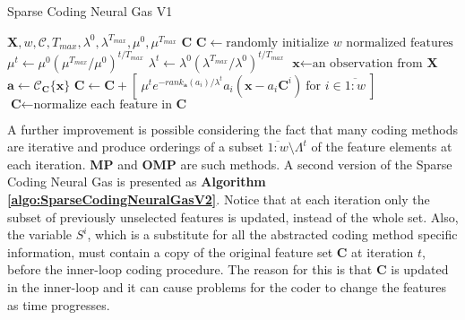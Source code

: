 \documentclass[12pt,a4paper,oneside,english]{UPBThesis}
\newcommand{\hcrange}[2]{\overline{{#1}\colon\!\!{#2}}}
\begin{document}
\begin{algorithm}
\caption{Sparse Coding Neural Gas V1}
\label{algo:SparseCodingNeuralGasV1}
\begin{algorithmic}
\Require $\textbf{X},w,\mathcal{C},T_{max},\lambda^0,\lambda^{T_{max}},\mu^0,\mu^{T_{max}}$
\Ensure $\textbf{C}$
\State $\textbf{C} \gets \mbox{randomly initialize $w$ normalized features}$
\For {$t = \hcrange{1}{T_{max}}$}
\State $\mu^t \gets \mu^0 (\mu^{T_{max}} / \mu^0)^{t / T_{max}}$  
\State $\lambda^t \gets \lambda^0 (\lambda^{T_{max}} / \lambda^0)^{t / T_{max}}$ 
\State $\textbf{x} \gets \text{an observation from $\textbf{X}$}$
\State $\textbf{a} \gets \mathcal{C}_{\textbf{C}}\{ \textbf{x} \}$
\State $\textbf{C} \gets \textbf{C} + [ ~ \mu^t e^{-rank_{\textbf{a}}(a_i) / \lambda^t} a_i (\textbf{x} - a_i \textbf{C}^i) ~ \mbox{for $i \in \hcrange{1}{w}$} ~ ]$
\State $\textbf{C} \gets \mbox{normalize each feature in $\textbf{C}$}$
\EndFor
\end{algorithmic}
\end{algorithm}

A further improvement is possible considering the fact that many coding methods are iterative and produce orderings of a subset $\hcrange{1}{w} \setminus \Lambda^t$ of the feature elements at each iteration. \textbf{MP} and \textbf{OMP} are such methods. A second version of the Sparse Coding Neural Gas is presented as \textbf{Algorithm \ref{algo:SparseCodingNeuralGasV2}}. Notice that at each iteration only the subset of previously unselected features is updated, instead of the whole set. Also, the variable $S^i$, which is a substitute for all the abstracted coding method specific information, must contain a copy of the original feature set $\textbf{C}$ at iteration $t$, before the inner-loop coding procedure. The reason for this is that $\textbf{C}$ is updated in the inner-loop and it can cause problems for the coder to change the features as time progresses.
\end{document}
